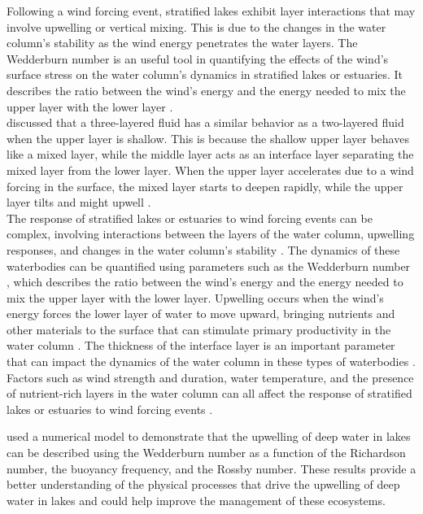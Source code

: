 \documentclass[tesis.tex]{subfiles}
\begin{document}
Following a wind forcing event, stratified lakes exhibit layer interactions that may involve upwelling or vertical mixing. This is due to the changes in the water column's stability as the wind energy penetrates the water layers. The Wedderburn number is an useful tool in quantifying the effects of the wind's surface stress on the water column's dynamics in stratified lakes or estuaries. It describes the ratio between the wind's energy and the energy needed to mix the upper layer with the lower layer \citep{jenkins1984response}.\\

\cite{Monismith1985} discussed that a three-layered fluid has a similar behavior as a two-layered fluid when the upper layer is shallow. This is because the shallow upper layer behaves like a mixed layer, while the middle layer acts as an interface layer separating the mixed layer from the lower layer. When the upper layer accelerates due to a wind forcing in the surface, the mixed layer starts to deepen rapidly, while the upper layer tilts and might upwell \citep{monismith2006vertical}.\\

The response of stratified lakes or estuaries to wind forcing events can be complex, involving interactions between the layers of the water column, upwelling responses, and changes in the water column's stability \citep{jayaweera2019turbulent}. The dynamics of these waterbodies can be quantified using parameters such as the Wedderburn number \citep{Monismith1985}, which describes the ratio between the wind's energy and the energy needed to mix the upper layer with the lower layer. Upwelling occurs when the wind's energy forces the lower layer of water to move upward, bringing nutrients and other materials to the surface that can stimulate primary productivity in the water column \citep{bastidas2021comparison}. The thickness of the interface layer is an important parameter that can impact the dynamics of the water column in these types of waterbodies \citep{xu2017vertical}. Factors such as wind strength and duration, water temperature, and the presence of nutrient-rich layers in the water column can all affect the response of stratified lakes or estuaries to wind forcing events \citep{nidheesh2018stratification}.

\cite{Shintani2010} used a numerical model to demonstrate that the upwelling of deep water in lakes can be described using the Wedderburn number as a function of the Richardson number, the buoyancy frequency, and the Rossby number. These results provide a better understanding of the physical processes that drive the upwelling of deep water in lakes and could help improve the management of these ecosystems.
\end{document}
